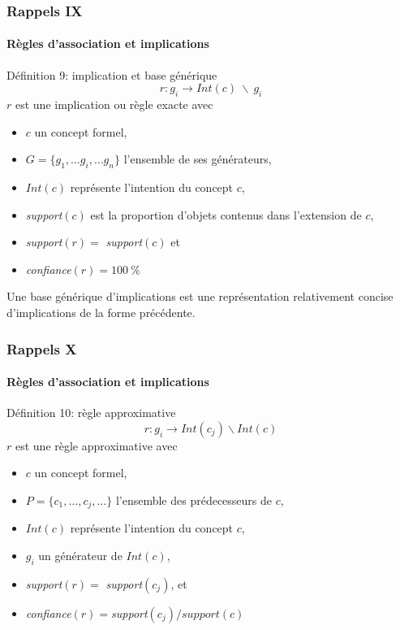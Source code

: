 \documentclass[french]{beamer}
\begin{document}
\begin{frame}
\frametitle{Rappels IX}
\framesubtitle{Règles d'association et implications}
\begin{block}{Définition 9: implication et base générique}
$$r: g_i \rightarrow Int(c)\ \backslash\ g_i $$
$r$ est une implication ou règle exacte avec
\begin{itemize}
\item $c$ un concept formel,
\item $G=\{g_1,\ldots g_i, \ldots g_n \}$ l'ensemble de ses générateurs,
\item $Int(c)$ représente l'intention du concept $c$,
\item \emph{support}$(c)$ est la proportion d'objets contenus dans l'extension de $c$,
\item \emph{support}$(r) = $ \emph{support}$(c)$ et
\item \emph{confiance}$(r) = 100\ \%$
\end{itemize}
Une base générique \parencite{Pasquier1999} d'implications est une représentation relativement concise d'implications de la forme précédente. 
\end{block}
\end{frame}

\begin{frame}
\frametitle{Rappels X}
\framesubtitle{Règles d'association et implications}
\begin{block}{Définition 10: règle approximative}
$$r: g_i \rightarrow Int(c_j)\backslash Int(c) $$
$r$ est une règle approximative avec
\begin{itemize}
\item $c$ un concept formel,
\item $P = \{c_1, \ldots, c_j, \ldots \}$ l'ensemble des prédecesseurs de $c$,
\item $Int(c)$ représente l'intention du concept $c$,
\item $g_i$ un générateur de $Int(c)$,
\item \emph{support}$(r) =$ \emph{support}$(c_j)$, et
\item  \emph{confiance}$(r) = $\emph{support}$(c_j)/support(c)$
\end{itemize}
\end{block}
\end{frame}
\end{document}
